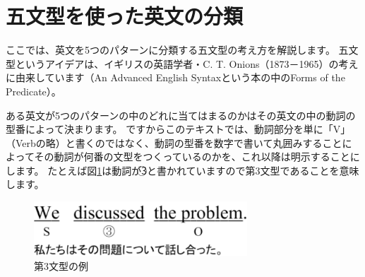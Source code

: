 \documentclass[titlepage]{jsarticle}
\def\maru#1{\textcircled{\scriptsize#1}}%
\begin{document}
  \section{五文型を使った英文の分類}
  ここでは、英文を5つのパターンに分類する五文型の考え方を解説します。
  五文型というアイデアは、イギリスの英語学者・C. T. Onions（1873－1965）の考えに由来しています（An Advanced English Syntaxという本の中のForms of the Predicate）。

  ある英文が5つのパターンの中のどれに当てはまるのかはその英文の中の動詞の型番によって決まります。
  ですからこのテキストでは、動詞部分を単に「V」（Verbの略）と書くのではなく、動詞の型番を数字で書いて丸囲みすることによってその動詞が何番の文型をつくっているのかを、これ以降は明示することにします。
たとえば図\ref{fig12}は動詞が\maru{3}と書かれていますので第3文型であることを意味します。
  \begin{figure}[htbp]
   \begin{center}
    \includegraphics[width=8cm]{./figure/fig12.pdf}
    \caption{第3文型の例}
    \label{fig12}
   \end{center}
  \end{figure}
\end{document}
